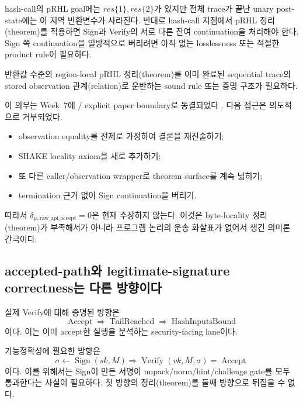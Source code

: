 hash-call의 pRHL goal에는 \(res\{1\},res\{2\}\)가 있지만 전체 trace가 끝난
unary post-state에는 이 지역 반환변수가 사라진다. 반대로 hash-call 지점에서
pRHL 정리(theorem)를 적용하면 Sign과 Verify의 서로 다른 잔여 continuation을 처리해야
한다. Sign 쪽 continuation을 일방적으로 버리려면 아직 없는 losslessness 또는
적절한 product rule이 필요하다.

\begin{openobligation}
반환값 수준의 region-local pRHL 정리(theorem)를 이미 완료된 sequential trace의 stored
observation 관계(relation)로 운반하는 sound rule 또는 증명 구조가 필요하다.
\end{openobligation}

이 의무는 Week~7에 \statusdeferred / explicit paper boundary로 동결되었다
\cite{product-replay}. 다음 접근은 의도적으로 거부되었다.

\begin{itemize}
  \item observation equality를 전제로 가정하여 결론을 재진술하기;
  \item SHAKE locality axiom을 새로 추가하기;
  \item 또 다른 caller/observation wrapper로 theorem surface를 계속 넓히기;
  \item termination 근거 없이 Sign continuation을 버리기.
\end{itemize}

따라서 \(\delta_{\mu,\mathrm{raw\_api\_accept}}=0\)은 현재 주장하지 않는다.
이것은 byte-locality 정리(theorem)가 부족해서가 아니라 프로그램 논리의 운송 화살표가
없어서 생긴 의미론 간극이다.

\subsection{accepted-path와 legitimate-signature correctness는 다른 방향이다}

실제 Verify에 대해 증명된 방향은
\[
  \operatorname{Accept}\Longrightarrow\operatorname{TailReached}
  \Longrightarrow\operatorname{HashInputsBound}
\]
이다. 이는 이미 accept한 실행을 분석하는 security-facing lane이다.

기능정확성에 필요한 방향은
\[
  \sigma\leftarrow\operatorname{Sign}(sk,M)
  \Longrightarrow
  \operatorname{Verify}(vk,M,\sigma)=\operatorname{Accept}
\]
이다. 이를 위해서는 Sign이 만든 서명이 unpack/norm/hint/challenge gate를 모두
통과한다는 사실이 필요하다. 첫 방향의 정리(theorem)를 둘째 방향으로 뒤집을 수 없다.

